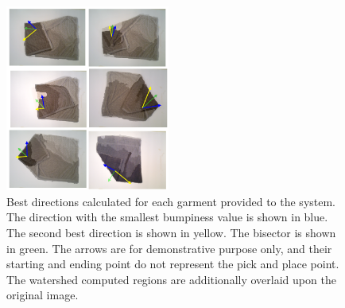 \begin{figure}[thpb]
    \centering
    \includegraphics[width=0.48\textwidth]{figures/directions_several.png}
    \caption{Best directions calculated for each garment provided to the system. The direction with the smallest bumpiness value is shown in blue. The second best direction is shown in yellow. The bisector is shown in green. The arrows are for demonstrative purpose only, and their starting and ending point do not represent the pick and place point. The watershed computed regions are additionally overlaid upon the original image.}
    \label{directions_several}
\end{figure}
